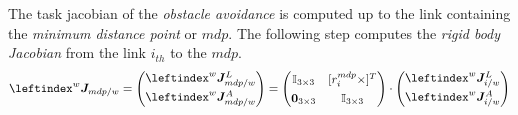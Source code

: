 \noindent The task jacobian of the \textit{obstacle avoidance} is computed up to the link containing the \textit{minimum distance point} or $mdp$. The following step computes the \textit{rigid body Jacobian} from the link $i_{th}$ to the $mdp$.
\begin{equation}
	\leftindex^{w}{\vec{J}}_{mdp/w} = 
	\begin{pmatrix}
		\leftindex^{w}{\vec{J}}_{mdp/w}^{L} \\[4pt]
		\leftindex^{w}{\vec{J}}_{mdp/w}^{A}
	\end{pmatrix} =
	\begin{pmatrix}
		\mathbb{I}_{3\times 3} & [r^{mdp}_{i}\times]^T \\[4pt]
		\vec{0}_{3\times 3} & \mathbb{I}_{3\times 3}
	\end{pmatrix} \cdot
	\begin{pmatrix}
		\leftindex^{w}{\vec{J}}_{i/w}^{L} \\[4pt]
		\leftindex^{w}{\vec{J}}_{i/w}^{A}
	\end{pmatrix} 
\end{equation}

